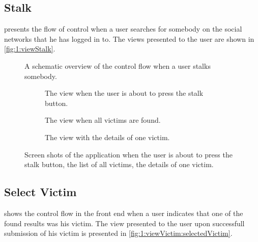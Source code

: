 \subsection{Stalk}
	 presents the flow of control when a user searches for somebody on the social networks that he has logged in to. The views presented to the user are shown in \autoref{fig:1:viewStalk}.


		\begin{figure}
			\caption{A schematic overview of the control flow when a user stalks somebody.}
			\label{fig:1:controlflowStalk}
		\end{figure}	

		\begin{figure}
			\begin{subfigure}{\textwidth}
				\caption{The view when the user is about to press the stalk button.}
				\label{fig:1:viewStalk:startStalk}
			\end{subfigure}
			\begin{subfigure}{\textwidth}
				\caption{The view when all victims are found.}
				\label{fig:1:viewStalk:allVictims}
			\end{subfigure}		
			\begin{subfigure}{\textwidth}
				\caption{The view with the details of one victim.}
				\label{fig:1:viewStalk:oneVictim}
			\end{subfigure}						
			
			\caption{Screen shots of the application when  the user is about to press the stalk button,  the list of all victims,  the details of one victim.}
			\label{fig:1:viewStalk}
		\end{figure}

\subsection{Select Victim}
	 shows the control flow in the front end when a user indicates that one of the found results was his victim. The view presented to the user upon successfull submission of his victim is presented in \cref{fig:1:viewVictim:selectedVictim}.


